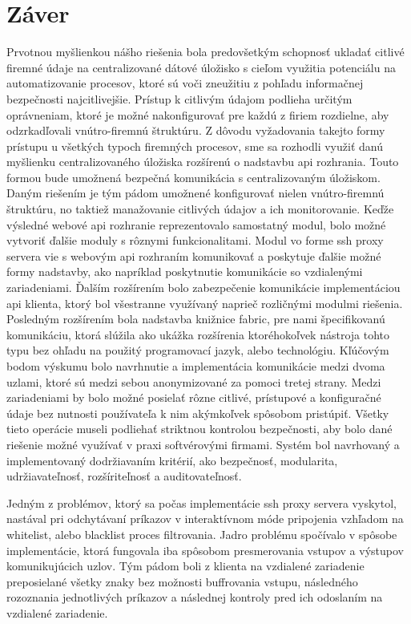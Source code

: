 \chapter{Záver}\label{ch:zaver}

Prvotnou myšlienkou nášho riešenia bola predovšetkým schopnosť ukladať citlivé firemné údaje na centralizované dátové úložisko
s cieľom využitia potenciálu na automatizovanie procesov, ktoré sú voči zneužitiu z pohľadu informačnej bezpečnosti
najcitlivejšie.
Prístup k citlivým údajom podlieha určitým oprávneniam, ktoré je možné nakonfigurovať pre každú z firiem rozdielne, aby
odzrkadľovali vnútro-firemnú štruktúru.
Z dôvodu vyžadovania takejto formy prístupu u všetkých typoch firemných procesov, sme sa rozhodli využiť danú myšlienku
centralizovaného úložiska rozšírenú o nadstavbu api rozhrania.
Touto formou bude umožnená bezpečná komunikácia s centralizovaným úložiskom.
Daným riešením je tým pádom umožnené konfigurovať nielen vnútro-firemnú štruktúru, no taktiež manažovanie citlivých údajov a ich monitorovanie.
Keďže výsledné webové api rozhranie reprezentovalo samostatný modul, bolo možné vytvoriť ďalšie moduly s rôznymi funkcionalitami.
Modul vo forme ssh proxy servera vie s webovým api rozhraním komunikovať a poskytuje ďalšie možné formy nadstavby,
ako napríklad poskytnutie komunikácie so vzdialenými zariadeniami.
Ďalším rozšírením bolo zabezpečenie komunikácie implementáciou api klienta, ktorý bol všestranne využívaný naprieč rozličnými
modulmi riešenia.
Posledným rozšírením bola nadstavba knižnice fabric, pre nami špecifikovanú komunikáciu, ktorá slúžila ako ukážka rozšírenia
ktoréhokoľvek nástroja tohto typu bez ohľadu na použitý programovací jazyk, alebo technológiu.
Kľúčovým bodom výskumu bolo navrhnutie a implementácia komunikácie medzi dvoma uzlami, ktoré sú medzi sebou anonymizované za
pomoci tretej strany.
Medzi zariadeniami by bolo možné posielať rôzne citlivé, prístupové a konfiguračné údaje bez nutnosti používateľa k nim
akýmkoľvek spôsobom pristúpiť.
Všetky tieto operácie museli podliehať striktnou kontrolou bezpečnosti, aby bolo dané riešenie možné využívať v praxi softvérovými firmami.
Systém bol navrhovaný a implementovaný dodržiavaním kritérií, ako bezpečnosť, modularita, udržiavateľnosť, rozšíriteľnosť
a auditovateľnosť.

Jedným z problémov, ktorý sa počas implementácie ssh proxy servera vyskytol, nastával pri odchytávaní príkazov v interaktívnom
móde pripojenia vzhľadom na whitelist, alebo blacklist proces filtrovania.
Jadro problému spočívalo v spôsobe implementácie, ktorá fungovala iba spôsobom presmerovania vstupov a výstupov komunikujúcich
uzlov.
Tým pádom boli z klienta na vzdialené zariadenie preposielané všetky znaky bez možnosti buffrovania vstupu, následného
rozoznania jednotlivých príkazov a následnej kontroly pred ich odoslaním na vzdialené zariadenie.

